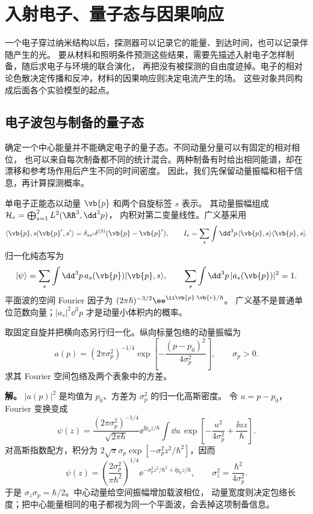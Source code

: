 \chapter{入射电子、量子态与因果响应}\label{chap:electron-foundations}

一个电子穿过纳米结构以后，探测器可以记录它的能量、到达时间，也可以记录伴随产生的光。
要从材料和照明条件预测这些结果，需要先描述入射电子怎样制备，随后求电子与环境的联合演化，
再把没有被探测的自由度迹掉。电子的相对论色散决定传播和反冲，材料的因果响应则决定电流产生的场。
这些对象共同构成后面各个实验模型的起点。

\section{电子波包与制备的量子态}\label{sec:feqo-primer-states}

确定一个中心能量并不能确定电子的量子态。不同动量分量可以有固定的相对相位，
也可以来自每次制备都不同的统计混合。两种制备有时给出相同能谱，却在漂移和参考场作用后产生不同的时间密度。
因此，我们先保留动量振幅和相干信息，再计算探测概率。

\begin{definition}
单电子正能态以动量 $\vb{p}$ 和两个自旋标签 $s$ 表示。
其动量振幅组成 $\mathcal H_e=\bigoplus_{s=1}^{2}L^2(\RR^3,\dd^3p)$，
内积对第二变量线性。广义基采用
\begin{equation}
\langle\vb{p},s|\vb{p}',s'\rangle
=\delta_{ss'}\delta^{(3)}(\vb{p}-\vb{p}'),\qquad
I_e=\sum_s\int\dd^3p\,|\vb{p},s\rangle\langle\vb{p},s|.
\label{eq:feqo-primer-continuum}
\end{equation}
归一化纯态写为
\[
|\psi\rangle=\sum_s\int\dd^3p\,a_s(\vb{p})|\vb{p},s\rangle,
\qquad \sum_s\int\dd^3p\,|a_s(\vb{p})|^2=1.
\]
平面波的空间 Fourier 因子为 $(2\pi\hbar)^{-3/2}\ee^{\ii\vb{p}\cdot\vb{r}/\hbar}$。
广义基不是普通单位范数向量；$|a_s|^2\dd^3p$ 才是动量小体积内的概率。
\end{definition}

\begin{example}[同一纵向高斯波包的动量宽度和空间宽度]
取固定自旋并把横向态另行归一化。纵向标量包络的动量振幅为
\[
a(p)=(2\pi\sigma_p^2)^{-1/4}
\exp\!\left[-\frac{(p-p_0)^2}{4\sigma_p^2}\right],\qquad \sigma_p>0.
\]
求其 Fourier 空间包络及两个表象中的方差。

\textbf{解。} $|a(p)|^2$ 是均值为 $p_0$、方差为 $\sigma_p^2$ 的归一化高斯密度。
令 $u=p-p_0$，Fourier 变换变成
\[
\psi(z)=\frac{(2\pi\sigma_p^2)^{-1/4}}{\sqrt{2\pi\hbar}}
\ee^{\ii p_0z/\hbar}
\int\dd u\,\exp\!\left[-\frac{u^2}{4\sigma_p^2}+\frac{\ii uz}{\hbar}\right].
\]
对高斯指数配方，积分为 $2\sqrt\pi\sigma_p\exp[-\sigma_p^2z^2/\hbar^2]$，因而
\[
\psi(z)=\left(\frac{2\sigma_p^2}{\pi\hbar^2}\right)^{1/4}
\ee^{-\sigma_p^2z^2/\hbar^2+\ii p_0z/\hbar},\qquad
\sigma_z^2=\frac{\hbar^2}{4\sigma_p^2}.
\]
于是 $\sigma_z\sigma_p=\hbar/2$。中心动量给空间振幅增加载波相位，
动量宽度则决定包络长度；把中心能量相同的电子都视为同一个平面波，会丢掉这项制备信息。
\end{example}

